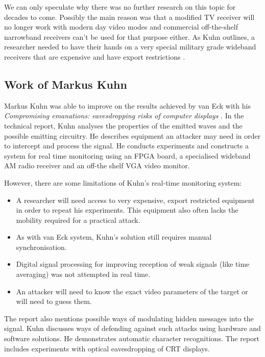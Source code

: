 \documentclass[a4paper,12pt,twoside,openright]{report}
\begin{document}
We can only speculate why there was no further research on this topic for decades to come. Possibly the main reason was that a modified TV receiver will no longer work with modern day video modes and commercial off-the-shelf narrowband receivers can't be used for that purpose either. As Kuhn outlines, a researcher needed to have their hands on a very special military grade wideband receivers that are expensive and have export restrictions \cite{kuhn2003compromising}.
 
\subsection{Work of Markus Kuhn}

Markus Kuhn was able to improve on the results achieved by van Eck with his \textit{Compromising emanations: eavesdropping risks of computer displays} \cite{kuhn2003compromising}. In the technical report, Kuhn analyses the properties of the emitted waves and the possible emitting circuitry. He describes equipment an attacker may need in order to intercept and process the signal. He conducts experiments and constructs a system for real time monitoring using an FPGA board, a specialised wideband AM radio receiver and an off-the shelf VGA video monitor. 

However, there are some limitations of Kuhn's real-time monitoring system:

\begin{itemize}

  \item A researcher will need access to very expensive, export restricted equipment in order to repeat his experiments. This equipment also often lacks the mobility required for a practical attack.
  \item As with van Eck system, Kuhn's solution still requires manual synchronisation.
  \item Digital signal processing for improving reception of weak signals (like time averaging) was not attempted in real time.
  \item An attacker will need to know the exact video parameters of the target or will need to guess them.

\end{itemize}

The report also mentions possible ways of modulating hidden messages into the signal. Kuhn discusses ways of defending against such attacks using hardware and software solutions. He demonstrates automatic character recognitions. The report includes experiments with optical eavesdropping of CRT displays.
\end{document}
